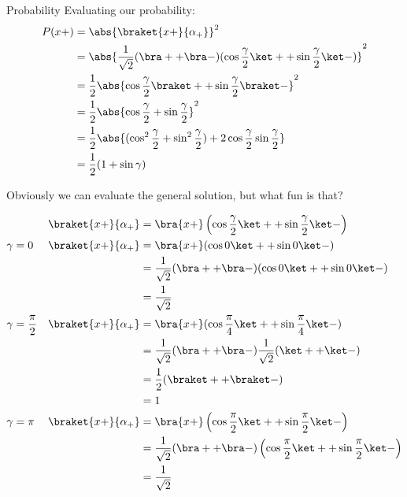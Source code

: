 \begin{answer}
\begin{answerpart}{Probability}
    Evaluating our probability:
    \begin{equation}
      \begin{split}
        P(x+)
        &= \abs{\braket{x+}{\alpha_+}}^2\\
        &= \abs{\frac{1}{\sqrt{2}}
        (\bra + + \bra -)
        (\cos{\frac{\gamma}{2}} \ket + + \sin{\frac{\gamma}{2}} \ket -)}^2\\
        &= \frac{1}{2}\abs{\cos{\frac{\gamma}{2}}\braket +
          + \sin{\frac{\gamma}{2}}\braket -}^2\\
        &= \frac{1}{2}\abs{\cos{\frac{\gamma}{2}}
          + \sin{\frac{\gamma}{2}}}^2\\
        &= \frac{1}{2}\abs{(\cos^2{\frac{\gamma}{2}}
          + \sin^2{\frac{\gamma}{2}})
          + 2\cos{\frac{\gamma}{2}}\sin{\frac{\gamma}{2}}}\\
        &= \frac{1}{2}(1 + \sin{\gamma})\\
      \end{split}
    \end{equation}

    Obviously we can evaluate the general solution, but what fun is
    that?  

    \begin{equation}
      \begin{alignedat}{2}
      &&\braket{x+}{\alpha_+} &=
      \bra{x+}\left(\cos{\frac{\gamma}{2}} \ket +
      + \sin{\frac{\gamma}{2}} \ket -\right)\\
      \gamma &= 0 \quad &
      \braket{x+}{\alpha_+} &=
      \bra{x+}(\cos{0} \ket + + \sin{0} \ket -)\\
      & & &=
      \frac{1}{\sqrt{2}} (\bra + + \bra -)(\cos{0} \ket + + \sin{0} \ket -)\\
      & & &=
      \frac{1}{\sqrt{2}}\\
      \gamma &= \frac{\pi}{2} \quad &
      \braket{x+}{\alpha_+} &=
      \bra{x+}(\cos{\frac{\pi}{4}} \ket + + \sin{\frac{\pi}{4}} \ket -)\\
      & & &=
      \frac{1}{\sqrt{2}}(\bra + + \bra -)\frac{1}{\sqrt{2}}(\ket + + \ket -)\\
      & & &=
      \frac{1}{2}(\braket + + \braket -)\\
      & & &=
      1\\
      \gamma &= \pi \quad &
      \braket{x+}{\alpha_+} &=
      \bra{x+}\left(\cos{\frac{\pi}{2}} \ket +
      + \sin{\frac{\pi}{2}} \ket -\right)\\
      & & &=
      \frac{1}{\sqrt{2}}(\bra + + \bra -)\left(\cos{\frac{\pi}{2}} \ket +
      + \sin{\frac{\pi}{2}} \ket -\right)\\
      & & &=
      \frac{1}{\sqrt{2}}\\
    \end{alignedat}
  \end{equation}


\end{answerpart}
\end{answer}

